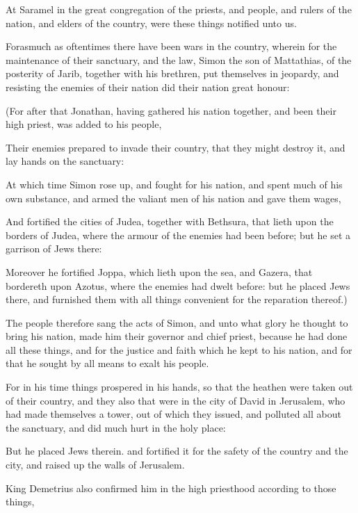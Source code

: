 {\par }{\PP {}At Saramel in the great congregation of the priests, and people, and rulers of the nation, and elders of the country, were these things notified unto us.
\par }{\PP {}Forasmuch as oftentimes there have been wars in the country, wherein for the maintenance of their sanctuary, and the law, Simon the son of Mattathias, of the posterity of Jarib, together with his brethren, put themselves in jeopardy, and resisting the enemies of their nation did their nation great honour:
\par }{\PP {}(For after that Jonathan, having gathered his nation together, and been their high priest, was added to his people,
\par }{\PP {}Their enemies prepared to invade their country, that they might destroy it, and lay hands on the sanctuary:
\par }{\PP {}At which time Simon rose up, and fought for his nation, and spent much of his own substance, and armed the valiant men of his nation and gave them wages,
\par }{\PP {}And fortified the cities of Judea, together with Bethsura, that lieth upon the borders of Judea, where the armour of the enemies had been before; but he set a garrison of Jews there:
\par }{\PP {}Moreover he fortified Joppa, which lieth upon the sea, and Gazera, that bordereth upon Azotus, where the enemies had dwelt before: but he placed Jews there, and furnished them with all things convenient for the reparation thereof.)
\par }{\PP {}The people therefore sang the acts of Simon, and unto what glory he thought to bring his nation, made him their governor and chief priest, because he had done all these things, and for the justice and faith which he kept to his nation, and for that he sought by all means to exalt his people.
\par }{\PP {}For in his time things prospered in his hands, so that the heathen were taken out of their country, and they also that were in the city of David in Jerusalem, who had made themselves a tower, out of which they issued, and polluted all about the sanctuary, and did much hurt in the holy place:
\par }{\PP {}But he placed Jews therein. and fortified it for the safety of the country and the city, and raised up the walls of Jerusalem.
\par }{\PP {}King Demetrius also confirmed him in the high priesthood according to those things,
}
